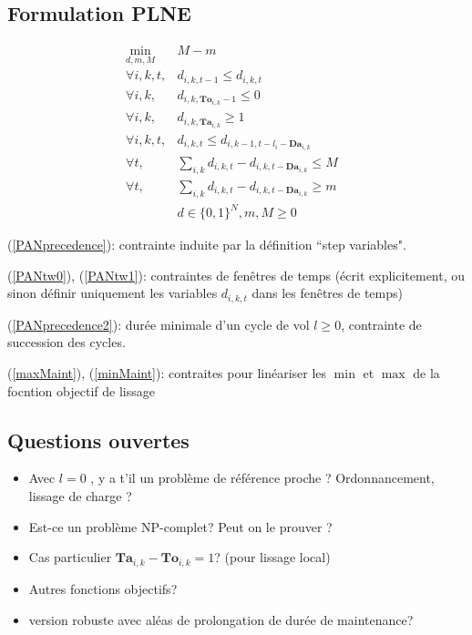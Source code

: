 \documentclass[a4paper,11pt]{article}
\begin{document}
    \subsection{Formulation PLNE}


    \begin{eqnarray}
    \displaystyle \min_{d,m,M} & M-m
     & \\
    \forall i , k, t, & d_{i,k,t-1}\leqslant d_{i,k,t} & \label{PANprecedence}\\
    \forall i , k, & d_{i,k,\mathbf{To}_{i,k}-1}\leqslant 0 & \label{PANtw0} \\
    \forall i , k, & d_{i,k,\mathbf{Ta}_{i,k}}\geqslant 1 & \label{PANtw1}\\
    \forall i , k, t, & d_{i,k,t}\leqslant d_{i,k-1,t-l_i-\mathbf{Da}_{i,k}} & \label{PANprecedence2}\\
    \forall t, & \displaystyle \sum_{i,k} d_{i,k,t}-d_{i,k,t- {\mathbf{Da}_{i,k}}} \leqslant M & \label{maxMaint}\\
    \forall t, & \displaystyle \sum_{i,k} d_{i,k,t}-d_{i,k,t- {\mathbf{Da}_{i,k}}} \geqslant m & \label{minMaint}\\
    & d \in \{0,1\}^N, m,M \geqslant 0
    \end{eqnarray}

    (\ref{PANprecedence}): contrainte induite par la définition ``step variables".

    (\ref{PANtw0}), (\ref{PANtw1}): contraintes de fenêtres de temps (écrit explicitement, ou sinon définir uniquement les variables $d_{i,k,t}$
    dans les fenêtres de temps)

    (\ref{PANprecedence2}): durée minimale d'un cycle de vol $l\geqslant 0$, contrainte de succession des cycles.

    (\ref{maxMaint}), (\ref{minMaint}): contraites pour linéariser les $\min$ et $\max$ de la focntion objectif de lissage

    \subsection{Questions ouvertes}

    \begin{itemize}
    \item Avec $l=0$ , y a t'il un problème de référence proche ? Ordonnancement, lissage de charge ?
    \item Est-ce un problème NP-complet? Peut on le prouver ?
     \item Cas particulier $\mathbf{Ta}_{i,k}-\mathbf{To}_{i,k}=1$? (pour lissage local)
     \item Autres fonctions objectifs?
     \item version robuste avec aléas de prolongation de durée de maintenance?
    \end{itemize}
\end{document}
